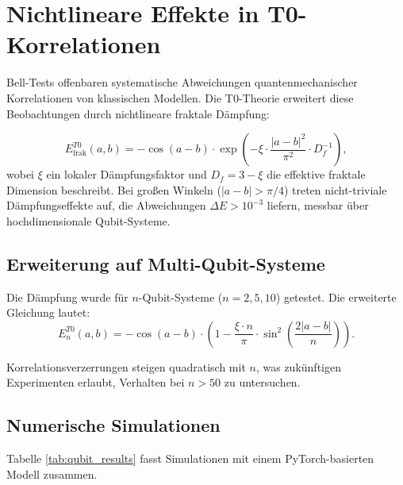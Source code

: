 \section{Nichtlineare Effekte in T0-Korrelationen}
\label{sec:nonlinear_extended}

Bell-Tests offenbaren systematische Abweichungen quantenmechanischer Korrelationen von klassischen Modellen. Die T0-Theorie erweitert diese Beobachtungen durch nichtlineare fraktale Dämpfung:

\begin{equation}
E^{T0}_{\text{frak}}(a,b) = -\cos(a-b) \cdot \exp\left(-\xi \cdot \frac{|a-b|^2}{\pi^2} \cdot D_f^{-1}\right),
\label{eq:t0_fractal}
\end{equation}
wobei $\xi$ ein lokaler Dämpfungsfaktor und $D_f = 3 - \xi$ die effektive fraktale Dimension beschreibt. Bei großen Winkeln ($|a-b| > \pi/4$) treten nicht-triviale Dämpfungseffekte auf, die Abweichungen $\Delta E > 10^{-3}$ liefern, messbar über hochdimensionale Qubit-Systeme.

\subsection{Erweiterung auf Multi-Qubit-Systeme}

Die Dämpfung wurde für $n$-Qubit-Systeme ($n=2,5,10$) getestet. Die erweiterte Gleichung lautet:
\begin{equation}
E_{n}^{T0}(a,b) = -\cos(a-b) \cdot \left(1 - \frac{\xi \cdot n}{\pi} \cdot \sin^2\left(\frac{2|a-b|}{n}\right)\right).
\label{eq:multiqubit}
\end{equation}

Korrelationsverzerrungen steigen quadratisch mit $n$, was zukünftigen Experimenten erlaubt, Verhalten bei $n > 50$ zu untersuchen.

\subsection{Numerische Simulationen}

Tabelle \ref{tab:qubit_results} fasst Simulationen mit einem PyTorch-basierten Modell zusammen.

\begin{table}[h]
\centering
\caption{Korrelationsergebnisse für Multi-Qubit-Tests mit T0-Dämpfung}
\label{tab:qubit_results}
\end{table}

